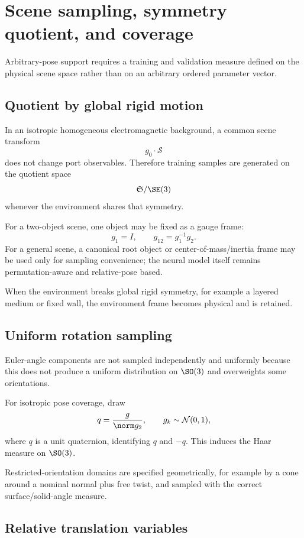 \section{Scene sampling, symmetry quotient, and coverage}
\label{sec:scene-sampling}

Arbitrary-pose support requires a training and validation measure defined on the
physical scene space rather than on an arbitrary ordered parameter vector.

\subsection{Quotient by global rigid motion}

In an isotropic homogeneous electromagnetic background, a common scene transform
\[
  g_0\cdot\mathcal S
\]
does not change port observables. Therefore training samples are generated on
the quotient space
\[
  \mathfrak S/\SE(3)
\]
whenever the environment shares that symmetry.

For a two-object scene, one object may be fixed as a gauge frame:
\[
  g_1=I,\qquad g_{12}=g_1^{-1}g_2.
\]
For a general scene, a canonical root object or center-of-mass/inertia frame may
be used only for sampling convenience; the neural model itself remains
permutation-aware and relative-pose based.

When the environment breaks global rigid symmetry, for example a layered medium
or fixed wall, the environment frame becomes physical and is retained.

\subsection{Uniform rotation sampling}

Euler-angle components are not sampled independently and uniformly because this
does not produce a uniform distribution on $\SO(3)$ and overweights some
orientations.

For isotropic pose coverage, draw
\[
  q=\frac{g}{\norm g_2},\qquad
  g_k\sim\mathcal N(0,1),
\]
where $q$ is a unit quaternion, identifying $q$ and $-q$. This induces the Haar
measure on $\SO(3)$.

Restricted-orientation domains are specified geometrically, for example by a
cone around a nominal normal plus free twist, and sampled with the correct
surface/solid-angle measure.

\subsection{Relative translation variables}

